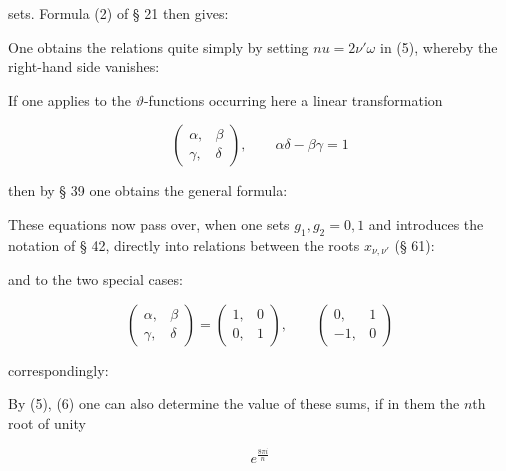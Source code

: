 
sets. Formula (2) of § 21 then gives:


One obtains the  relations quite simply by setting
$nu = 2\nu'\omega$ in (5), whereby the right-hand side vanishes:


If one applies to the $\vartheta$-functions occurring here a
linear transformation

\[
\begin{pmatrix} \alpha, & \beta \\ \gamma, & \delta \end{pmatrix}, \qquad \alpha\delta - \beta\gamma = 1
\]

then by § 39 one obtains the general formula:


These equations now pass over, when one sets $g_1, g_2 = 0, 1$
and introduces the notation of § 42, directly into relations between the roots $x_{\nu,\nu'}$ (§ 61):


and to the two special cases:

\[
\begin{pmatrix} \alpha, & \beta \\ \gamma, & \delta \end{pmatrix} = \begin{pmatrix} 1, & 0 \\ 0, & 1 \end{pmatrix}, \qquad \begin{pmatrix} 0, & 1 \\ -1, & 0 \end{pmatrix}
\]

correspondingly:



By (5), (6) one can also determine the value of these sums, if in them the $n$th root of unity

\[
e^{\frac{8\pi i}{n}}
\]
